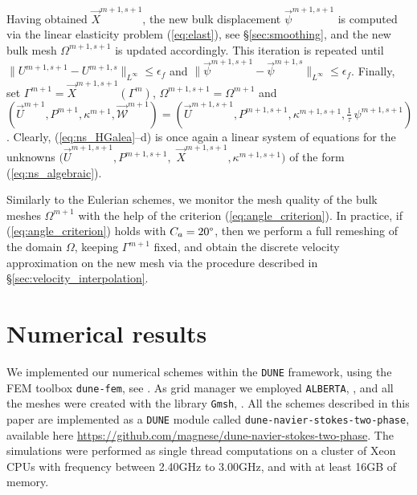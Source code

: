 \documentclass[a4paper,12pt,onecolumn]{article}
\newcommand{\W}{\vec{\mathcal W}}
\newcommand{\myurl}[1]{\hfil\penalty 100 \hfilneg \hbox{\url{#1}}} %
\begin{document}
Having obtained $\vec X^{m+1,s+1}$, the new bulk displacement
$\vec \psi^{m+1,s+1}$ is computed via the linear elasticity problem
(\ref{eq:elast}), see \S\ref{sec:smoothing},
and the new bulk mesh $\Omega^{m+1,s+1}$ is updated accordingly.
This iteration is repeated until $\|U^{m+1,s+1}-U^{m+1,s}\|_{L^\infty}
\leq\epsilon_f$ and $\|\vec \psi^{m+1,s+1}-\vec \psi^{m+1,s}\|_{L^\infty}
\leq\epsilon_f$.
Finally, set
$\Gamma^{m+1} = \vec X^{m+1,s+1}(\Gamma^m)$, $\Omega^{m+1,s+1}=\Omega^{m+1}$
and \linebreak $(\vec U^{m+1}, P^{m+1}, \kappa^{m+1},\W^{m+1}) =
(\vec U^{m+1,s+1}, P^{m+1,s+1},\kappa^{m+1,s+1},\tfrac1\tau\,\psi^{m+1,s+1})$.
Clearly, \linebreak
\mbox{(\ref{eq:ns_HGalea}--d)} is once again
a linear system of equations for the unknowns
$(\vec U^{m+1,s+1}, P^{m+1,s+1},$ $ \vec X^{m+1,s+1},
\kappa^{m+1,s+1})$ of the form (\ref{eq:ns_algebraic}).

Similarly to the Eulerian schemes, we monitor the mesh quality of
the bulk meshes $\Omega^{m+1}$ with the help of the criterion
(\ref{eq:angle_criterion}). In practice, if (\ref{eq:angle_criterion})
holds with $C_a=20\degree$, then we perform a full remeshing of the domain
$\Omega$, keeping $\Gamma^{m+1}$ fixed, and obtain the discrete velocity
approximation on the new mesh via the procedure described in
\S\ref{sec:velocity_interpolation}.

\setcounter{equation}{0}
\section{Numerical results} \label{sec:nr}

We implemented our numerical schemes within the \verb|DUNE| framework,
using the FEM toolbox \verb|dune-fem|, see
\cite{dunegridpaperI08,dunegridpaperII08,dunefempaper10}.
As grid manager we employed \verb|ALBERTA|, \cite{Alberta},
and all the meshes were created with the library \verb|Gmsh|,
\cite{GeuzaineR09}. All the schemes described in this paper are implemented as
a \verb|DUNE| module called \verb|dune-navier-stokes-two-phase|, available here
\myurl{https://github.com/magnese/dune-navier-stokes-two-phase}.
The simulations were performed as single thread computations on a cluster of
Xeon CPUs with frequency between 2.40GHz to 3.00GHz, and with at
least 16GB of memory.
\end{document}
